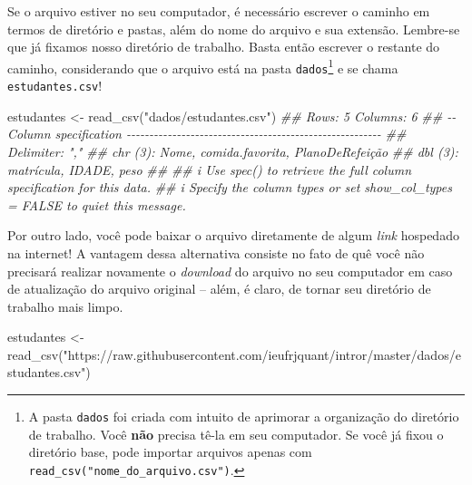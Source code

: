 \documentclass[
  letterpaper,
  DIV=11,
  numbers=noendperiod]{scrreprt}
\newenvironment{Shaded}{\begin{snugshade}}{\end{snugshade}}
\newcommand{\DocumentationTok}[1]{\textcolor[rgb]{0.37,0.37,0.37}{\textit{#1}}}
\newcommand{\FunctionTok}[1]{\textcolor[rgb]{0.28,0.35,0.67}{#1}}
\newcommand{\NormalTok}[1]{\textcolor[rgb]{0.00,0.23,0.31}{#1}}
\newcommand{\OtherTok}[1]{\textcolor[rgb]{0.00,0.23,0.31}{#1}}
\newcommand{\StringTok}[1]{\textcolor[rgb]{0.13,0.47,0.30}{#1}}
\begin{document}
Se o arquivo estiver no seu computador, é necessário escrever o caminho
em termos de diretório e pastas, além do nome do arquivo e sua extensão.
Lembre-se que já fixamos nosso diretório de trabalho. Basta então
escrever o restante do caminho, considerando que o arquivo está na pasta
\texttt{dados}\footnote{A pasta \texttt{dados} foi criada com intuito de
  aprimorar a organização do diretório de trabalho. Você \textbf{não}
  precisa tê-la em seu computador. Se você já fixou o diretório base,
  pode importar arquivos apenas com
  \texttt{read\_csv("nome\_do\_arquivo.csv")}.} e se chama
\texttt{estudantes.csv}!

\begin{Shaded}
\begin{Highlighting}[]
\NormalTok{estudantes }\OtherTok{\textless{}{-}} \FunctionTok{read\_csv}\NormalTok{(}\StringTok{"dados/estudantes.csv"}\NormalTok{)}
\DocumentationTok{\#\# Rows: 5 Columns: 6}
\DocumentationTok{\#\# {-}{-} Column specification {-}{-}{-}{-}{-}{-}{-}{-}{-}{-}{-}{-}{-}{-}{-}{-}{-}{-}{-}{-}{-}{-}{-}{-}{-}{-}{-}{-}{-}{-}{-}{-}{-}{-}{-}{-}{-}{-}{-}{-}{-}{-}{-}{-}{-}{-}{-}{-}{-}{-}{-}{-}{-}{-}{-}{-}}
\DocumentationTok{\#\# Delimiter: ","}
\DocumentationTok{\#\# chr (3): Nome, comida.favorita, PlanoDeRefeição}
\DocumentationTok{\#\# dbl (3): matrícula, IDADE, peso}
\DocumentationTok{\#\# }
\DocumentationTok{\#\# i Use \textasciigrave{}spec()\textasciigrave{} to retrieve the full column specification for this data.}
\DocumentationTok{\#\# i Specify the column types or set \textasciigrave{}show\_col\_types = FALSE\textasciigrave{} to quiet this message.}
\end{Highlighting}
\end{Shaded}

Por outro lado, você pode baixar o arquivo diretamente de algum
\emph{link} hospedado na internet! A vantagem dessa alternativa consiste
no fato de quê você não precisará realizar novamente o \emph{download}
do arquivo no seu computador em caso de atualização do arquivo original
-- além, é claro, de tornar seu diretório de trabalho mais limpo.

\begin{Shaded}
\begin{Highlighting}[]
\NormalTok{estudantes }\OtherTok{\textless{}{-}} \FunctionTok{read\_csv}\NormalTok{(}\StringTok{"https://raw.githubusercontent.com/ieufrjquant/intror/master/dados/estudantes.csv"}\NormalTok{)}
\end{Highlighting}
\end{Shaded}
\end{document}
